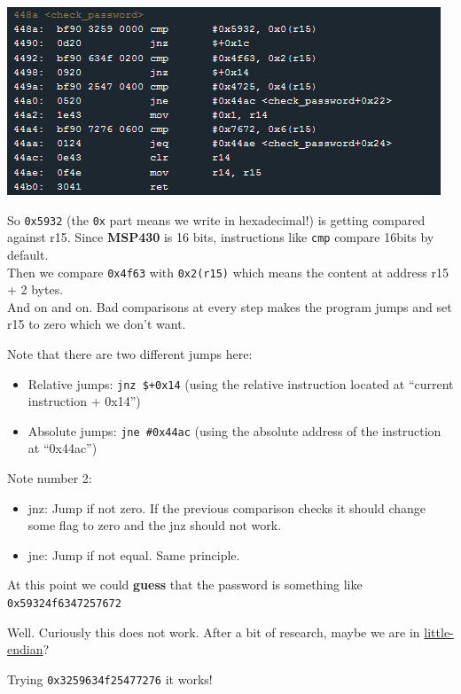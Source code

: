 \documentclass[a4paper,11pt]{article}
\begin{document}
\includegraphics{img/2_2.PNG}

So \texttt{0x5932} (the \texttt{0x} part means we write in hexadecimal!)
is getting compared against r15. Since \textbf{MSP430} is 16 bits,
instructions like \texttt{cmp} compare 16bits by default.\\Then we
compare \texttt{0x4f63} with \texttt{0x2(r15)} which means the content
at address r15 + 2 bytes.\\And on and on. Bad comparisons at every step
makes the program jumps and set r15 to zero which we don't want.

Note that there are two different jumps here:

\begin{itemize}
\itemsep1pt\parskip0pt
\item
  Relative jumps: \texttt{jnz \$+0x14} (using the relative instruction
  located at ``current instruction + 0x14'')
\item
  Absolute jumps: \texttt{jne \#0x44ac} (using the absolute address of
  the instruction at ``0x44ac'')
\end{itemize}

Note number 2:

\begin{itemize}
\itemsep1pt\parskip0pt
\item
  jnz: Jump if not zero. If the previous comparison checks it should
  change some flag to zero and the jnz should not work.
\item
  jne: Jump if not equal. Same principle.
\end{itemize}

At this point we could \textbf{guess} that the password is something
like \texttt{0x59324f6347257672}

Well. Curiously this does not work. After a bit of research, maybe we
are in \href{http://en.wikipedia.org/wiki/Endianness}{little-endian}?

Trying \texttt{0x3259634f25477276} it works!
\end{document}
